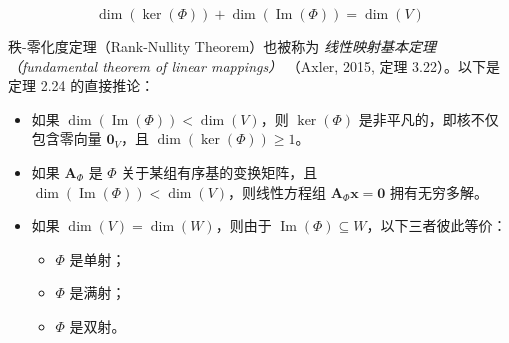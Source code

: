 \begin{equation}
\operatorname{dim}(\operatorname{ker}(\Phi)) + \operatorname{dim}(\operatorname{Im}(\Phi)) = \operatorname{dim}(V)
\tag{2.129}\label{eq:2-129}
\end{equation}

秩-零化度定理（Rank-Nullity Theorem）也被称为 \emph{线性映射基本定理（fundamental theorem of linear mappings）} （Axler, 2015, 定理 3.22）。以下是定理 2.24 的直接推论：

\begin{itemize}
\item 如果 $ \operatorname{dim}(\operatorname{Im}(\Phi)) < \operatorname{dim}(V) $，则 $ \operatorname{ker}(\Phi) $ 是非平凡的，即核不仅包含零向量 $ \boldsymbol{0}_V $，且 $ \operatorname{dim}(\operatorname{ker}(\Phi)) \geqslant 1 $。
\item 如果 $ \boldsymbol{A}_\Phi $ 是 $ \Phi $ 关于某组有序基的变换矩阵，且 $ \operatorname{dim}(\operatorname{Im}(\Phi)) < \operatorname{dim}(V) $，则线性方程组 $ \boldsymbol{A}_\Phi \boldsymbol{x} = \boldsymbol{0} $ 拥有无穷多解。
\item 如果 $ \operatorname{dim}(V) = \operatorname{dim}(W) $，则由于 $ \operatorname{Im}(\Phi) \subseteq W $，以下三者彼此等价：
\begin{itemize}
\item $ \Phi $ 是单射；
\item $ \Phi $ 是满射；
\item $ \Phi $ 是双射。
\end{itemize}
\end{itemize}
